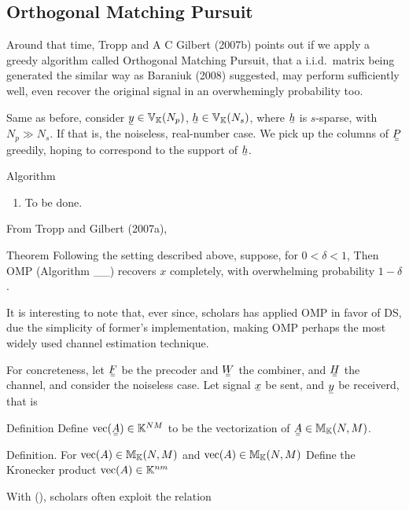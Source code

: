 \subsection{Orthogonal Matching Pursuit}

Around that time, Tropp and A C Gilbert (2007b) points out if we apply a greedy algorithm called Orthogonal Matching Pursuit, that a i.i.d.\ matrix being generated the similar way as Baraniuk (2008) suggested, may perform sufficiently well, even recover the original signal in an overwhemingly probability too.

Same as before, consider \(\V{y} \in \MB{V}_\MB{K} (N_p)\), \(\V{h} \in \MB{V}_\MB{K} (N_s)\), where \(\V{h}\) is \(s\)-sparse, with \(N_p \gg N_s\).
If
that is, the noiseless, real-number case.
We pick up the columns of \(\M{P}\) greedily, hoping to correspond to the support of \(\V{h}\).

\Result
{Algorithm}
{
\begin{enumerate}
\item To be done.
\end{enumerate}
}

From Tropp and Gilbert (2007a),

\Result
{Theorem}
{
Following the setting described above, suppose, for \(0 <\delta <1\),
%
%
Then OMP (Algorithm \_\_) recovers \(x\) completely, with overwhelming probability \(1-\delta\).
}

It is interesting to note that, ever since, scholars has applied OMP in favor of DS, due the simplicity of former's implementation, making OMP perhaps the most widely used channel estimation technique.

For concreteness, let \(\M{F}\) be the precoder and \(\M{W}\) the combiner, and \(\M{H}\) the channel, and consider the noiseless case.
Let signal \(\V{x}\) be sent, and \(\V{y}\) be receiverd, that is
%
%

\Result
{Definition}
{
Define \(\RM{vec} (\M{A}) \in \MB{K}^{NM}\) to be the vectorization of \(\M{A} \in \MB{M}_{\MB{K}} (N,M)\).
}

\Result
{Definition.}
{
For \(\mathrm{vec} (A) \in \mathbb{M}_{\mathbb{K}} (N,M)\) and \(\mathrm{vec} (A) \in \mathbb{M}_{\mathbb{K}} (N,M)\)
Define the Kronecker product \(\mathrm{vec} (A) \in \mathbb{K}^{nm}\) 
}

With (), scholars often exploit the relation
%
%

